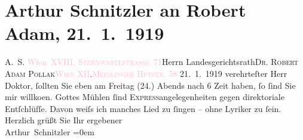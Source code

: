 

               \section[Arthur Schnitzler an Robert Adam, 21. 1. 1919]{ Arthur Schnitzler an Robert Adam, 21. 1. 1919}\nopagebreak{}\rehead{ }\normalsize\beginnumbering{} \toendnotes[C]{\smallbreak\pagebreak[2]} 
\pstart{}{\pb}A. S. \textcolor{pink}{Wien XVIII, \textsc{Sternwartestrasse} 71}{}\ledrightnote{\textcolor{pink}{Sternwartestraße}}\pend{}{\bigskip}\pstart{}Herrn Landesgerichtsrath\pend{}\pstart{}\textsc{Dr. Robert Adam Pollak}\pend{}\pstart{}\textcolor{pink}{\textsc{Wien} XII}{}\ledrightnote{\textcolor{pink}{XII., Meidling}}.\pend{}\pstart{}\textcolor{pink}{\textsc{Meidlinger Hptstr.} 58}{}\ledrightnote{\textcolor{pink}{Meidlinger Hauptstraße}}\pend{}{\bigskip}\pstart
           \raggedleft{}{\pb}21. 1. 1919\pend
           \pstart{}verehrteſter Herr Doktor,\pend\pstart
           ſollten Sie eben am Freitag (24.) Abends nach
                        6 Zeit haben, ſo ſind Sie mir willko{\geminationm}en.
                    Gottes Mühlen ſind \textsc{Express}angelegenheiten gegen
                    direktoriale Entſchlüſſe. Davon weiſs ich manches Lied zu ſingen – ohne Lyriker
                    zu ſein.\pend
           \pstart
           Herzlich grüßt Sie Ihr ergebener{\\[\baselineskip]}\spacefill\mbox{Arthur Schnitzler}\pend
           \leftskip=0em{}\endnumbering{}  
      